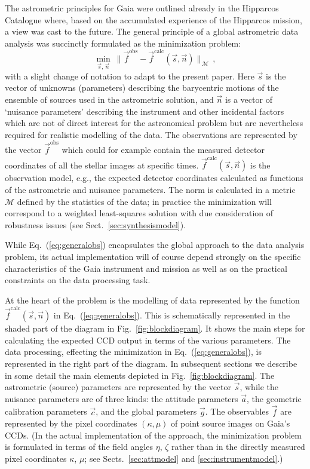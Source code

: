 \documentclass[structabstract]{aa}
\begin{document}
The astrometric principles for Gaia were outlined already in the Hipparcos
Catalogue \cite[Vol.~3, Ch.~23]{hip:catalogue} where, based on the
accumulated experience of the Hipparcos mission, a view was cast to the
future. The general principle of a global astrometric data analysis was
succinctly formulated as the minimization problem:
\begin{equation}
\min_{\vec{s},\,\vec{n}}~\lVert \vec{f}^\text{obs} - \vec{f}^\text{calc}
(\vec{s},\vec{n})\rVert_{\,\mathcal{M}} \, ,
    \label{eq:generalobs}
\end{equation}
with a slight change of notation to adapt to the present paper.
Here $\vec{s}$ is the vector of unknowns (parameters) describing the
barycentric motions of the ensemble of sources used in the astrometric solution,
and $\vec{n}$ is a vector of `nuisance parameters' describing the instrument
and other incidental factors which are not of
direct interest for the astronomical problem but are nevertheless required
for realistic modelling of the data.
The observations are represented by the vector $\vec{f}^\text{obs}$ which
could for example contain the measured detector coordinates 
of all the stellar
images at specific times. $\vec{f}^\text{calc}(\vec{s},\vec{n})$ is the observation
model, e.g., the expected detector coordinates calculated as functions of
the astrometric and nuisance parameters. The norm is calculated in a metric
$\mathcal{M}$ defined by the statistics of the data; in practice the minimization
will correspond to a weighted least-squares solution with due consideration
of robustness issues (see Sect.~\ref{sec:synthesismodel}).

While Eq.~(\ref{eq:generalobs}) encapsulates the global approach to the
data analysis problem, its actual implementation will of course depend
strongly on the specific characteristics of the Gaia instrument and
mission as well as on the practical constraints on the data processing
task.

At the heart of the problem is the modelling of data represented
by the function $\vec{f}^\text{calc}(\vec{s},\vec{n})$ in
Eq.~(\ref{eq:generalobs}). This is schematically represented in the
shaded part of the diagram in Fig.~\ref{fig:blockdiagram}. It shows
the main steps for calculating the expected CCD output in terms of the
various parameters. The data processing, effecting the minimization
in Eq.~(\ref{eq:generalobs}), is represented in the right part of
the diagram. In subsequent sections we describe in some detail the
main elements depicted in Fig.~\ref{fig:blockdiagram}. The astrometric
(source) parameters are represented by the vector $\vec{s}$, while
the nuisance parameters are of three kinds: the attitude parameters
$\vec{a}$, the geometric calibration parameters $\vec{c}$, and the
global parameters $\vec{g}$. The observables $\vec{f}$ are represented
by the pixel coordinates $(\kappa,\mu)$ of point source images on
Gaia's CCDs. (In the actual implementation of the approach, the
minimization problem is formulated in terms of the field angles 
$\eta$, $\zeta$ rather than in the directly measured pixel coordinates 
$\kappa$, $\mu$; see Sects.~\ref{sec:attmodel} and 
\ref{sec:instrumentmodel}.)
\end{document}
